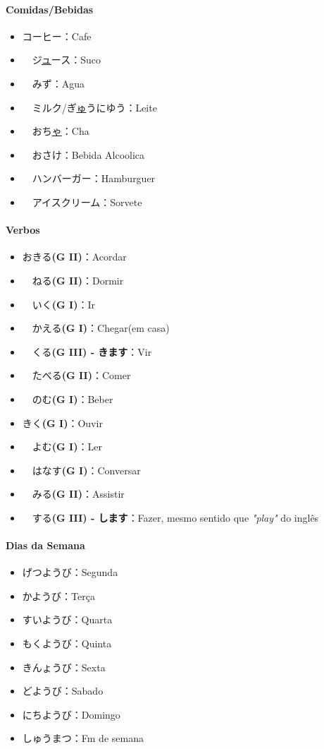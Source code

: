\documentclass[a4paper, 12pt]{article}
\begin{document}
\begin{CJK}{UTF8}{min}
\paragraph{Comidas/Bebidas}
	\begin{itemize}
		\item コーヒー：Cafe
		\item　ジ\underline{ュ}ース：Suco
		\item　みず：Agua
		\item　ミルク/ぎ\underline{ゅ}うにゆう：Leite
		\item　おち\underline{ゃ}：Cha
		\item　おさけ：Bebida Alcoolica
		\item　ハンバーガー：Hamburguer
		\item　アイスクリーム：Sorvete
	\end{itemize}

\paragraph{Verbos}
	\begin{itemize}
		\item おきる\textbf{(G II)}：Acordar
		\item　ねる\textbf{(G II)}：Dormir
		\item　いく\textbf{(G I)}：Ir
		\item　かえる\textbf{(G I)}：Chegar(em casa)
		\item　くる\textbf{(G III) - きます}：Vir
		\item　たべる\textbf{(G II)}：Comer
		\item　のむ\textbf{(G I)}：Beber
		\item きく\textbf{(G I)}：Ouvir
		\item　よむ\textbf{(G I)}：Ler
		\item　はなす\textbf{(G I)}：Conversar
		\item　みる\textbf{(G II)}：Assistir
		\item　する\textbf{(G III) - します}：Fazer, mesmo sentido que \textit{"play"} do inglês
	\end{itemize}
\end{CJK}

\paragraph{Dias da Semana}
		\begin{CJK}{UTF8}{min}
			\begin{itemize}
				\item げつようび：Segunda
				\item かようび：Terça
				\item すいようび：Quarta
				\item もくようび：Quinta
				\item きんょうび：Sexta
				\item どようび：Sabado
				\item にちようび：Domingo
				\item しゅうまつ：Fm de semana
				
			\end{itemize}
		\end{CJK}
\end{document}
